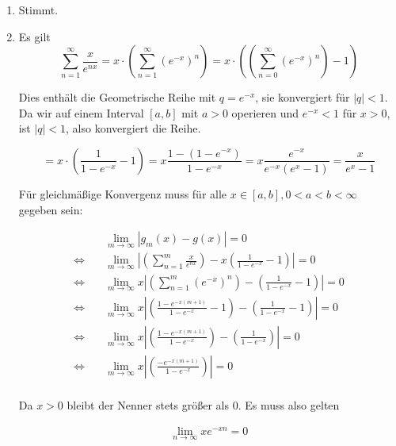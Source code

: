 \documentclass[a4paper,german,12pt,smallheadings]{scrartcl}
\begin{document}
\begin{enumerate}[(1)]
\item Stimmt.
\item Es gilt
  \begin{equation*}
    \sum_{n=1}^\infty \frac{x}{e^{nx}} = x \cdot \left(\sum_{n=1}^\infty \left(e^{-x}\right)^n\right) = x \cdot \left(\left(\sum_{n=0}^\infty \left(e^{-x}\right)^n\right) - 1\right)
  \end{equation*}

  Dies enthält die Geometrische Reihe mit $q=e^{-x}$, sie konvergiert
  für $|q|<1$.  Da wir auf einem Interval $[a,b]$ mit $a > 0$ operieren und
  $e^{-x} < 1$ für $x>0$, ist $|q| < 1$, also konvergiert die Reihe.

  \begin{equation*}
      = x \cdot \left( \frac{1}{1-e^{-x}} - 1 \right) = x \frac{1 - (1-e^{-x})}{1-e^{-x}} = x \frac{e^{-x}}{e^{-x} (e^x - 1)} = \frac{x}{e^x-1}
  \end{equation*}

  Für gleichmäßige Konvergenz muss für alle $x \in [a,b], 0 < a < b < \infty$ gegeben sein:

  \begin{align*}
    & \quad \lim_{m \to \infty} \left| g_m(x) - g(x) \right| = 0 \\
    \Leftrightarrow & \quad \lim_{m \to \infty} \left|\left(\sum_{n=1}^{m}\frac{x}{e^{nx}}\right) - x \left(\frac{1}{1-e^{-x}} - 1\right)\right| = 0 \\
    \Leftrightarrow & \quad \lim_{m \to \infty} x \left|\left(\sum_{n=1}^{m} \left(e^{-x}\right)^n \right) - \left(\frac{1}{1-e^{-x}} - 1\right)\right| = 0 \\
    \Leftrightarrow & \quad \lim_{m \to \infty} x \left|\left(\frac{1-e^{-x(m+1)}}{1-e^{-x}} - 1 \right)- \left(\frac{1}{1-e^{-x}} - 1\right)\right| = 0 \\
    \Leftrightarrow & \quad \lim_{m \to \infty} x \left|\left(\frac{1-e^{-x(m+1)}}{1-e^{-x}} \right)- \left(\frac{1}{1-e^{-x}} \right)\right| = 0 \\
    \Leftrightarrow & \quad \lim_{m \to \infty} x \left|\left(\frac{-e^{-x(m+1)}}{1-e^{-x}} \right)\right| = 0 \\
  \end{align*}

  Da $x > 0$ bleibt der Nenner stets größer als $0$. Es muss also gelten

  \begin{align*}
    \lim_{n \to \infty} x e^{-xn} = 0 \\
  \end{align*}


\end{enumerate}
\end{document}
